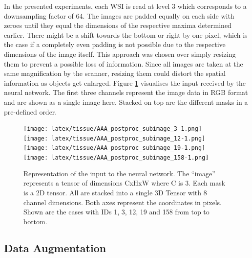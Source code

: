 In the presented experiments, each WSI is read at level 3 which corresponds to a downsampling factor of 64. The images are padded equally on each side with zeroes until they equal the dimensions of the respective maxima determined earlier. There might be a shift towards the bottom or right by one pixel, which is the case if a completely even padding is not possible due to the respective dimensions of the image itself. This approach was chosen over simply resizing them to prevent a possible loss of information. Since all images are taken at the same magnification by the scanner, resizing them could distort the spatial information as objects get enlarged. Figure \ref{fig:downsample_input} visualises the input received by the neural network. The first three channels represent the image data in RGB format and are shown as a single image here. Stacked on top are the different masks in a pre-defined order.

\begin{figure}[h!t]
    \centering
    \vspace{-14pt}\texttt{[image: latex/tissue/AAA\_postproc\_subimage\_3-1.png]} \\
    \vspace{-14pt}\texttt{[image: latex/tissue/AAA\_postproc\_subimage\_12-1.png]} \\ 
    \vspace{-14pt}\texttt{[image: latex/tissue/AAA\_postproc\_subimage\_19-1.png]} \\
    \vspace{-14pt}\texttt{[image: latex/tissue/AAA\_postproc\_subimage\_158-1.png]} \\
  \caption[Neural network input]{Representation of the input to the neural network. The “image” represents a tensor of dimensions CxHxW where C is 3. Each mask is a 2D tensor. All are stacked into a single 3D Tensor with 8 channel dimensions. Both axes represent the coordinates in pixels. Shown are the cases with IDs 1, 3, 12, 19 and 158 from top to bottom.}
  \label{fig:downsample_input}
\end{figure}

\subsection{Data Augmentation}

